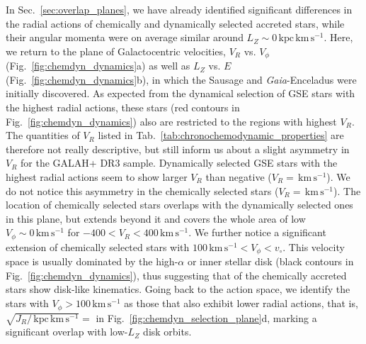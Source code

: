 \documentclass[fleqn,usenatbib]{mnras}
\newcommand{\added}[1]{#1}
\newcommand{\kms}{\,\mathrm{km\,s^{-1}}}	%
\newcommand{\kpckms}{\,\mathrm{kpc\,km\,s^{-1}}}	%
\newcommand{\Gaia}{\textit{Gaia}\xspace} %
\begin{document}
In Sec.~\ref{sec:overlap_planes}, we have already identified significant differences in the radial actions of chemically and dynamically selected accreted stars, while their angular momenta were on average similar around $L_Z \sim 0 \kpckms$. Here, we return to the plane of Galactocentric velocities, $V_R$ vs. $V_\phi$ (Fig.~\ref{fig:chemdyn_dynamics}a) as well as $L_Z$ vs. $E$ (Fig.~\ref{fig:chemdyn_dynamics}b), in which the Sausage \citep{Belokurov2018} and \Gaia-Enceladus \citep{Helmi2018} were initially discovered. As expected from the dynamical selection of GSE stars with the highest radial actions, these stars (red contours in Fig.~\ref{fig:chemdyn_dynamics}) also are restricted to the regions with highest $V_R$. The quantities of $V_R$ listed in Tab.~\ref{tab:chronochemodynamic_properties} are therefore not really descriptive, but still inform us about a slight asymmetry in $V_R$ for the GALAH+ DR3 sample. Dynamically selected GSE stars with the highest radial actions seem to show larger $V_R$ than negative ($V_R=$$\kms$). We do not notice this asymmetry in the chemically selected stars ($V_R=$$\kms$). The location of chemically selected stars overlaps with the dynamically selected ones in this plane, but extends beyond it and covers the whole area of low $V_\phi \sim 0 \kms$ for $-400 < V_R < 400\kms$. We further notice a significant extension of  chemically selected stars with \added{$100 \kms < V_\phi < v_\circ$}. This velocity space is usually dominated by the \added{high-$\alpha$ or inner} stellar disk (black contours in Fig.~\ref{fig:chemdyn_dynamics}), thus suggesting that  of the chemically accreted stars show disk-like kinematics. Going back to the action space, we identify the stars with $V_\phi > 100 \kms$ as those that also exhibit lower radial actions, that is, $\sqrt{J_R / \kpckms} = $ in Fig.~\ref{fig:chemdyn_selection_plane}d, marking a significant overlap with low-$L_Z$ disk orbits.
\end{document}
